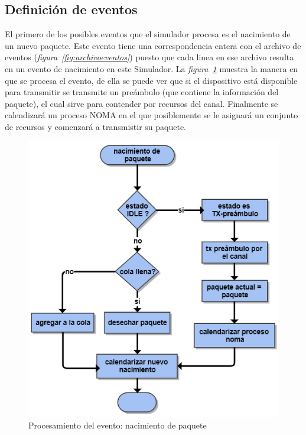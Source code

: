 \subsection{Definición de eventos}

El primero de los posibles eventos que el simulador procesa es el nacimiento de un nuevo paquete. Este evento tiene una correspondencia entera con el archivo de eventos (\textit{figura~\ref{fig:archivoeventos}}) puesto que cada linea en ese archivo resulta en un evento de nacimiento en este Simulador. La \textit{figura~\ref{fig:flownacimiento}} muestra la manera en que se procesa el evento, de ella se puede ver que si el dispositivo está disponible para transmitir se transmite un preámbulo (que contiene la información del paquete), el cual sirve para contender por recursos del canal. Finalmente se calendizará un proceso NOMA en el que posiblemente se le asignará un conjunto de recursos y comenzará a transmistir su paquete.\newline

\begin{figure}[th]
    \centering
    \includegraphics[scale=.7]{Figures/flownacimiento.png}
    \decoRule
    \caption[Procesamiento del evento: nacimiento de paquete]{Procesamiento del evento: nacimiento de paquete}
    \label{fig:flownacimiento}
\end{figure}

